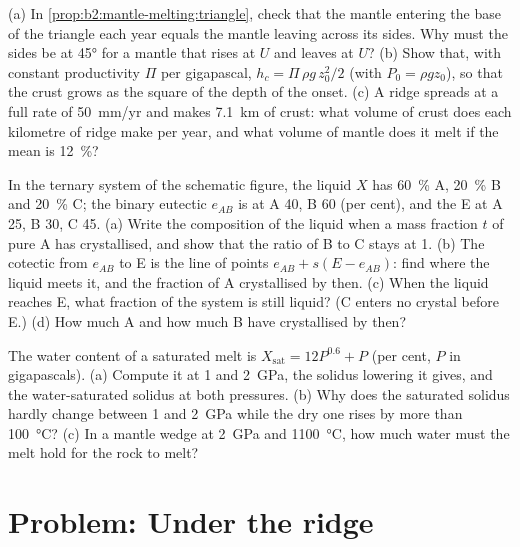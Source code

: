 \begin{exercise}[$\star\star\star$]\label{exo:b2:mantle-melting:10}
(a) In \cref{prop:b2:mantle-melting:triangle}, check that the mantle entering the
base of the triangle each year equals the mantle leaving across its sides. Why
must the sides be at \ang{45} for a mantle that rises at $U$ and leaves at $U$?
(b) Show that, with constant productivity $\Pi$ per gigapascal, $h_c = \Pi\,\rho
g\,z_0^2/2$ (with $P_0 = \rho g z_0$), so that the crust grows as the square of the
depth of the onset. (c) A ridge spreads at a full rate of \qty{50}{mm/yr} and
makes \qty{7.1}{km} of crust: what volume of crust does each kilometre of ridge
make per year, and what volume of mantle does it melt if the mean  is
\qty{12}{\percent}?
\end{exercise}

\begin{exercise}[$\star\star\star$]\label{exo:b2:mantle-melting:11}
In the ternary system of the schematic figure, the liquid $X$ has
\qty{60}{\percent} A, \qty{20}{\percent} B and \qty{20}{\percent} C; the
binary eutectic $e_{AB}$ is at A 40, B 60 (per cent), and the  E at
A 25, B 30, C 45. (a) Write the composition of the liquid when a mass fraction $t$
of pure A has crystallised, and show that the ratio of B to C stays at 1. (b) The
cotectic from $e_{AB}$ to E is the line of points $e_{AB} + s(E - e_{AB})$: find
where the liquid meets it, and the fraction of A crystallised by then. (c) When
the liquid reaches E, what fraction of the system is still liquid? (C enters no
crystal before E.) (d) How much A and how much B have crystallised by then?
\end{exercise}

\begin{exercise}[$\star\star\star$]\label{exo:b2:mantle-melting:12}
The water content of a saturated melt is $X_{\mathrm{sat}} = 12P^{0.6} + P$
(per cent, $P$ in gigapascals). (a) Compute it at 1 and \qty{2}{GPa}, the solidus
lowering it gives, and the water-saturated solidus at both pressures. (b) Why does
the saturated solidus hardly change between 1 and \qty{2}{GPa} while the dry one
rises by more than \qty{100}{\celsius}? (c) In a mantle wedge at \qty{2}{GPa} and
\qty{1100}{\celsius}, how much water must the melt hold for the rock to melt?
\end{exercise}

\section{Problem: Under the ridge}

